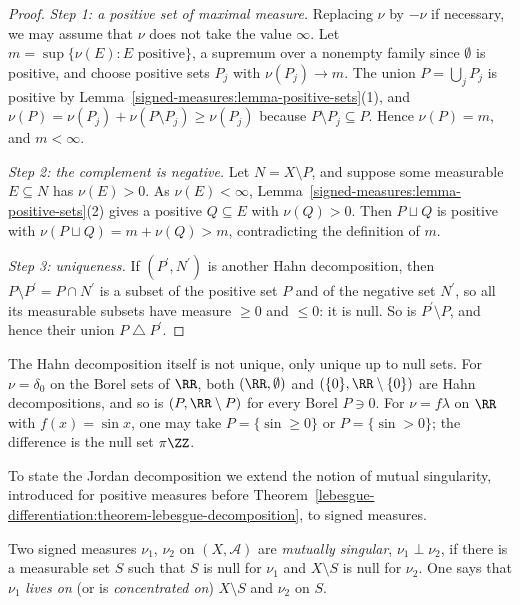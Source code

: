\begin{proof}
\emph{Step 1: a positive set of maximal measure.} Replacing $\nu$ by $-\nu$ if necessary, we may assume that $\nu$ does not take the value $\infty$. Let $m = \sup\{\nu(E) : E \text{ positive}\}$, a
supremum over a nonempty family since $\emptyset$ is positive, and choose positive sets $P_j$ with $\nu(P_j) \to m$. The union $P = \bigcup_jP_j$ is positive by
Lemma~\ref{signed-measures:lemma-positive-sets}(1), and $\nu(P) = \nu(P_j) + \nu(P \setminus P_j) \geq \nu(P_j)$ because $P \setminus P_j \subseteq P$. Hence $\nu(P) = m$, and $m < \infty$.

\emph{Step 2: the complement is negative.} Let $N = X \setminus P$, and suppose some measurable $E \subseteq N$ has $\nu(E) > 0$. As $\nu(E) < \infty$, Lemma~\ref{signed-measures:lemma-positive-sets}(2)
gives a positive $Q \subseteq E$ with $\nu(Q) > 0$. Then $P \sqcup Q$ is positive with $\nu(P \sqcup Q) = m + \nu(Q) > m$, contradicting the definition of $m$.

\emph{Step 3: uniqueness.} If $(P^{\prime}, N^{\prime})$ is another Hahn decomposition, then $P \setminus P^{\prime} = P \cap N^{\prime}$ is a subset of the positive set $P$ and of the negative set
$N^{\prime}$, so all its measurable subsets have measure $\geq 0$ and $\leq 0$: it is null. So is $P^{\prime} \setminus P$, and hence their union $P \mathbin{\triangle} P^{\prime}$.
\end{proof}

\begin{counterexample}\label{signed-measures:counterexample-hahn-not-unique}
The Hahn decomposition itself is not unique, only unique up to null sets. For $\nu = \delta_0$ on the Borel sets of $\RR$, both $(\RR, \emptyset)$ and $(\{0\}, \RR \setminus \{0\})$ are Hahn
decompositions, and so is $(P, \RR \setminus P)$ for every Borel $P \ni 0$. For $\nu = f\lambda$ on $\RR$ with $f(x) = \sin x$, one may take $P = \{\sin \geq 0\}$ or $P = \{\sin > 0\}$; the
difference is the null set $\pi\ZZ$.
\end{counterexample}

To state the Jordan decomposition we extend the notion of mutual singularity, introduced for positive measures before
Theorem~\ref{lebesgue-differentiation:theorem-lebesgue-decomposition}, to signed measures.

\begin{definition}\label{signed-measures:definition-singular}
Two signed measures $\nu_1$, $\nu_2$ on $(X, \mathcal{A})$ are \emph{mutually singular}, $\nu_1 \perp \nu_2$, if there is a measurable set $S$ such that $S$ is null for $\nu_1$ and $X \setminus S$
is null for $\nu_2$. One says that $\nu_1$ \emph{lives on} (or is \emph{concentrated on}) $X \setminus S$ and $\nu_2$ on $S$.
\end{definition}

